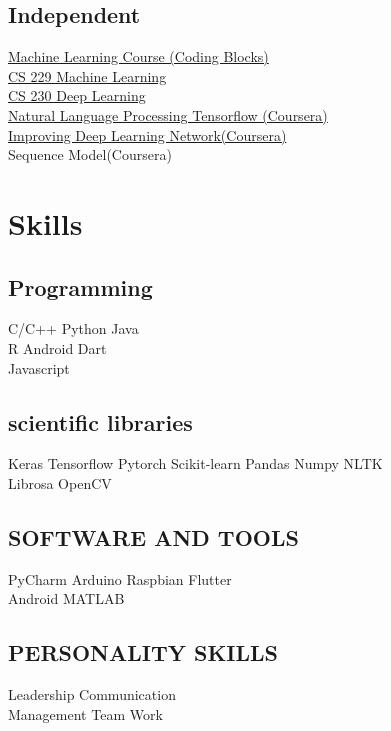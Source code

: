 \documentclass[]{deedy-resume-openfont}
\begin{document}
\begin{minipage}[t]{0.33\textwidth}
\subsection{Independent}
\href{https://online.codingblocks.com/app/certificates/CBOL-26635-2848}{Machine Learning Course (Coding Blocks)} \\
\href{http://cs229.stanford.edu/}{CS 229 Machine Learning} \\
\href{https://cs230.stanford.edu/}{CS 230 Deep Learning} \\
\href{https://coursera.org/share/0d85004d7396f79556aa1a92de8a3ab5}{Natural Language Processing Tensorflow (Coursera)} \\
\href{https://coursera.org/share/bf38126b8c3094913923da5075b257d5}{Improving Deep Learning Network(Coursera)} \\
Sequence Model(Coursera) \\

\section{Skills}
\subsection{Programming}
C/C++ \textbullet{}   Python \textbullet{} Java \\
\textbullet{} R \textbullet{} Android \textbullet{} Dart \\ 
\textbullet{} Javascript 
\sectionsep   \\ 
\subsection{scientific libraries}
Keras \textbullet{} Tensorflow \textbullet{} Pytorch \textbullet{} Scikit-learn \textbullet{} Pandas \textbullet{} Numpy \textbullet{} NLTK\\ \textbullet{} Librosa \textbullet{} OpenCV\\
\sectionsep
\subsection{SOFTWARE AND TOOLS}
PyCharm \textbullet{} Arduino \textbullet{} Raspbian
\textbullet{} Flutter\\ \textbullet{} Android \textbullet{} MATLAB \\
\sectionsep
\subsection{PERSONALITY SKILLS}
Leadership \textbullet{} Communication \\
\textbullet{} Management \textbullet{} Team Work\\
\sectionsep


%
%

\end{minipage} 
\end{document}
